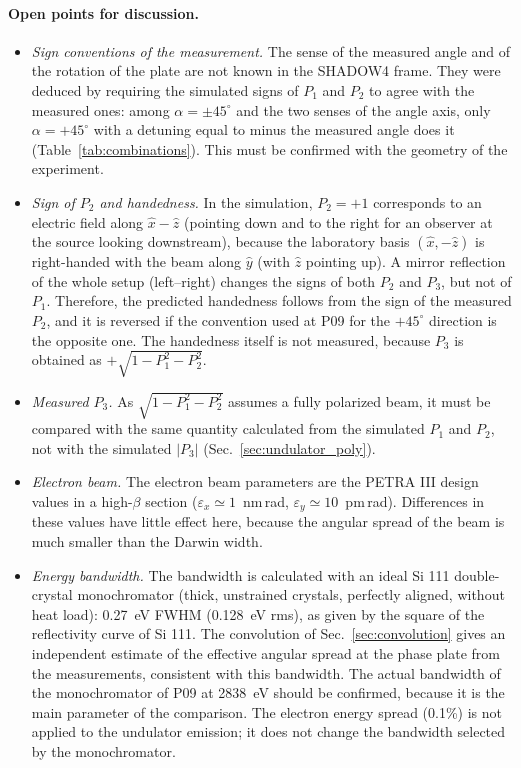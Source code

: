 \documentclass{iucr}
\begin{document}
\paragraph{Open points for discussion.} 
\begin{itemize}
\item {\it Sign conventions of the measurement.} The sense of the measured angle and of the rotation of the plate are not known in the SHADOW4 frame. They were deduced by requiring the simulated signs of $P_1$ and $P_2$ to agree with the measured ones: among $\alpha=\pm45^\circ$ and the two senses of the angle axis, only $\alpha=+45^\circ$ with a detuning equal to minus the measured angle does it (Table~\ref{tab:combinations}). This must be confirmed with the geometry of the experiment.
\item {\it Sign of $P_2$ and handedness.} In the simulation, $P_2=+1$ corresponds to an electric field along $\hat{x}-\hat{z}$ (pointing down and to the right for an observer at the source looking downstream), because the laboratory basis $(\hat{x},-\hat{z})$ is right-handed with the beam along $\hat{y}$ (with $\hat{z}$ pointing up). A mirror reflection of the whole setup (left--right) changes the signs of both $P_2$ and $P_3$, but not of $P_1$. Therefore, the predicted handedness follows from the sign of the measured $P_2$, and it is reversed if the convention used at P09 for the $+45^\circ$ direction is the opposite one. The handedness itself is not measured, because $P_3$ is obtained as $+\sqrt{1-P_1^2-P_2^2}$.
\item {\it Measured $P_3$.} As $\sqrt{1-P_1^2-P_2^2}$ assumes a fully polarized beam, it must be compared with the same quantity calculated from the simulated $P_1$ and $P_2$, not with the simulated $|P_3|$ (Sec.~\ref{sec:undulator_poly}).
\item {\it Electron beam.} The electron beam parameters are the PETRA III design values in a high-$\beta$ section ($\varepsilon_x\simeq1$~nm\,rad, $\varepsilon_y\simeq10$~pm\,rad). Differences in these values have little effect here, because the angular spread of the beam is much smaller than the Darwin width.
\item {\it Energy bandwidth.} The bandwidth is calculated with an ideal Si 111 double-crystal monochromator (thick, unstrained crystals, perfectly aligned, without heat load): 0.27~eV FWHM (0.128~eV rms), as given by the square of the reflectivity curve of Si 111. The convolution of Sec.~\ref{sec:convolution} gives an independent estimate of the effective angular spread at the phase plate from the measurements, consistent with this bandwidth. The actual bandwidth of the monochromator of P09 at 2838~eV should be confirmed, because it is the main parameter of the comparison. The electron energy spread (0.1\%) is not applied to the undulator emission; it does not change the bandwidth selected by the monochromator.

\end{itemize}
\end{document}
